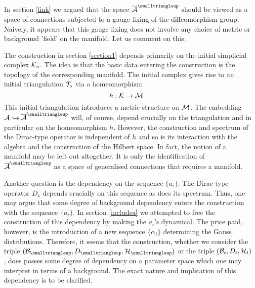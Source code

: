 \documentclass[12pt]{article}
\def\a{\alpha}
\def\ca{{\cal A}}
\def\cb{{\cal B}}
\def\ch{{\cal H}}
\def\ck{{\cal K}}
\def\cm{{\cal M}}
\def\ct{{\cal T}}
\begin{document}
In section \ref{link} we argued that the space $\overline{\ca}^{\smalltriangleup}$ should be viewed as a space of connections subjected to a gauge fixing of the diffeomorphism group. Naively, it appears that this gauge fixing does not involve any choice of metric or background 'field' on the manifold. Let us comment on this.

The construction in section \ref{section1} depends primarily on the initial simplicial complex $\ck_o$. The idea is that the basic data entering the construction is the topology of the corresponding manifold. The initial complex gives rise to an initial triangulation $\ct_o$ via a homeomorphism $$h:\ck\rightarrow\cm\;.$$ 
 This initial triangulation introduces a metric structure on $\cm$. The embedding $\ca\hookrightarrow\overline{\ca}^{\smalltriangleup}$ will, of course, depend crucially on the triangulation and in particular on the homeomorphism $h$. However, the construction and spectrum of the Dirac-type operator is independent of $h$ and so is its interaction with the algebra and the construction of the Hilbert space. In fact, the notion of a manifold may be left out altogether. It is only the identification of $\overline{\ca}^{\smalltriangleup}$ as a space of generalised connections that requires a manifold.



Another question is the dependency on the sequence $\{a_i\}$. The Dirac type operator $D_\smalltriangleup$ depends crucially on this sequence as does its spectrum. Thus, one may argue that some degree of background dependency enters the construction with the sequence $\{a_i\}$. In section \ref{includea} we attempted to free the construction of this dependency by making the $a_i$'s dynamical. The price paid, however, is the introduction of a new sequence $\{\a_i\}$ determining the Gauss distributions. Therefore, it seems that the construction, whether we consider the triple $(\cb_{\smalltriangleup},D_{\smalltriangleup},\ch_\smalltriangleup)$ or the triple $(\cb_t,D_t,\ch_t)$, does posses some degree of dependency on a parameter space which one may interpret in terms of a background. The exact nature and implication of this dependency is to be clarified.
\end{document}
